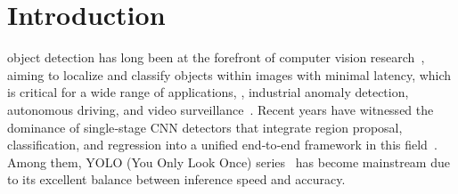 \section{Introduction}

 object detection has long been at the forefront of computer vision research~\cite{obj_det_survey,survey_20y}, aiming to localize and classify objects within images with minimal latency, which is critical for a wide range of applications, \eg, industrial anomaly detection, autonomous driving, and video surveillance~\cite{yolo_based_survey}. Recent years have witnessed the dominance of single‑stage CNN detectors that integrate region proposal, classification, and regression into a unified end‑to‑end framework in this field~\cite{rcnn,maskrcnn,yolov1,rt_detr}. Among them, YOLO (You Only Look Once) series~\cite{yolov1,yolov2,yolov3,yolov4,yolov5,yolov6,yolov7,yolov8,yolov9,yolov10,yolo11,yolov12} has become mainstream due to its excellent balance between inference speed and accuracy.

